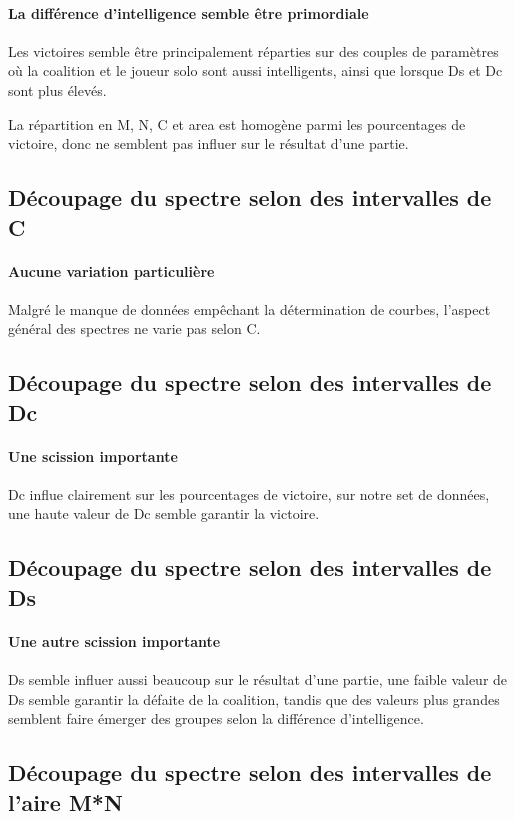 \paragraph{La différence d'intelligence semble être primordiale}
Les victoires semble être principalement réparties sur des couples de paramètres où la coalition et le joueur solo sont aussi intelligents, ainsi que lorsque Ds et Dc sont plus élevés.

La répartition en M, N, C et area est homogène parmi les pourcentages de victoire, donc ne semblent pas influer sur le résultat d'une partie.


\subsection{Découpage du spectre selon des intervalles de C}
\paragraph{Aucune variation particulière}
Malgré le manque de données empêchant la détermination de courbes, l'aspect général des spectres ne varie pas selon C.


\subsection{Découpage du spectre selon des intervalles de Dc}
\paragraph{Une scission importante}
Dc influe clairement sur les pourcentages de victoire, sur notre set de données, une haute valeur de Dc semble garantir la victoire. 


\subsection{Découpage du spectre selon des intervalles de Ds}
\paragraph{Une autre scission importante}
Ds semble influer aussi beaucoup sur le résultat d'une partie, une faible valeur de Ds semble garantir la défaite de la coalition, tandis que des valeurs plus grandes semblent faire émerger des groupes selon la différence d'intelligence.


\subsection{Découpage du spectre selon des intervalles de l'aire M*N}
